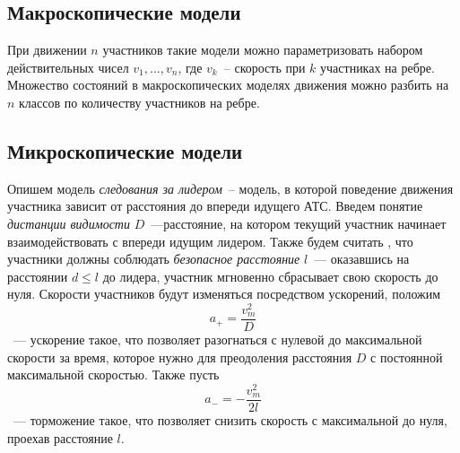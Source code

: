 \documentclass[12pt, a4paper]{article}
\begin{document}
\subsection{Макроскопические модели}

При движении $n$ участников такие модели можно параметризовать набором действительных чисел $v_1, \dots, v_n$, где $v_k$~-- скорость при $k$ участниках на ребре. Множество состояний в макроскопических моделях движения можно разбить на $n$ классов по количеству участников на ребре. 

\subsection{Микроскопические модели}
Опишем модель \textit{следования за лидером}~-- модель, в которой поведение движения участника зависит от расстояния до впереди идущего АТС. 
Введем понятие \textit{дистанции видимости} $D$~---расстояние, на котором текущий участник начинает взаимодействовать с впереди идущим лидером. Также будем считать , что участники должны соблюдать \textit{безопасное расстояние} $l$~--- оказавшись на расстоянии $d \leq l$ до лидера, участник мгновенно сбрасывает свою скорость до нуля. Скорости участников будут изменяться посредством ускорений, положим
$$a_+ = \frac{v^2_m}{D}$$~--- ускорение такое, что позволяет разогнаться с нулевой до максимальной скорости за время, которое нужно для преодоления расстояния $D$ с постоянной максимальной скоростью. 
Также пусть $$a_- = -\frac{v^2_m}{2l}$$~--- торможение такое, что позволяет снизить скорость с максимальной до нуля, проехав расстояние $l$.
\end{document}
